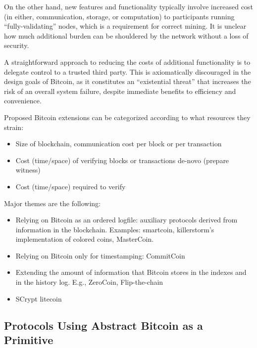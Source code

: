 On the other hand, new features and functionality typically involve increased cost (in either, communication, storage, or computation) to participants running ``fully-validating'' nodes, which is a requirement for correct mining. It is unclear how much additional burden can be shouldered by the network without a loss of security.

A straightforward approach to reducing the costs of additional functionality is to delegate control to a trusted third party. This is axiomatically discouraged in the design goals of Bitcoin, as it constitutes an ``existential threat'' that increases the risk of an overall system failure, despite immediate benefits to efficiency and convenience.
 
Proposed Bitcoin extensions can be categorized according to what resources they strain:
\begin{itemize}
\item Size of blockchain, communication cost per block or per transaction
\item Cost (time/space) of verifying blocks or transactions de-novo (prepare witness)
\item Cost (time/space) required to verify
\end{itemize}

Major themes are the following:
\begin{itemize}
\item Relying on Bitcoin as an ordered logfile: auxiliary protocols derived from information in the blockchain. Examples: smartcoin, killerstorm's implementation of colored coins, MasterCoin.
\item Relying on Bitcoin only for timestamping: CommitCoin
\item Extending the amount of information that Bitcoin stores in the indexes and in the history log. E.g., ZeroCoin, Flip-the-chain
\item SCrypt litecoin
\end{itemize}


\cite{jgarzik-smartcoin}
\cite{miller2001capability}
\cite{szabo1997formalizing,bitcointalk-bondmarkets,wiki-distributedmarkets}

\subsection{Protocols Using Abstract Bitcoin as a Primitive}
